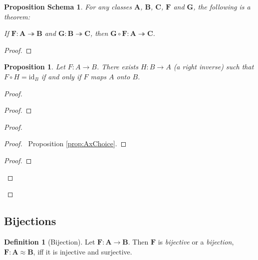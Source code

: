\documentclass{book}
\let\qed\relax
\newtheorem{prop}[ax]{Proposition}
\newtheorem{props}[ax]{Proposition Schema}
\theoremstyle{definition}
\newtheorem{df}[ax]{Definition}
\newcommand{\id}[1]{\ensuremath{\mathrm{id}_{#1}}}
\begin{document}
\begin{props}
\label{prop:compsurj}
For any classes $\mathbf{A}$, $\mathbf{B}$, $\mathbf{C}$, $\mathbf{F}$ and $\mathbf{G}$, the following is a theorem:

If $\mathbf{F} : \mathbf{A} \twoheadrightarrow \mathbf{B}$ and $\mathbf{G} : \mathbf{B} \twoheadrightarrow \mathbf{C}$, then $\mathbf{G} \circ \mathbf{F} : \mathbf{A} \twoheadrightarrow \mathbf{C}$.
\end{props}

\begin{proof}
\pf
{}
\qed
\end{proof}
\begin{prop}
Let $F : A \rightarrow B$. There exists $H : B \rightarrow A$ (a \emph{right inverse}) such that $F \circ H = \id{B}$ if and only if $F$ maps $A$ onto $B$.
\end{prop}

\begin{proof}
\pf
{}
\begin{proof}
\end{proof}
\begin{proof}
	\begin{proof}
		\pf\ Proposition \ref{prop:AxChoice}.
	\end{proof}
	\step{d}{$F \circ H = \id{B}$}
	\begin{proof}
	\end{proof}
\end{proof}
\qed
\end{proof}

\subsection{Bijections}

\begin{df}[Bijection]
Let $\mathbf{F} : \mathbf{A} \rightarrow \mathbf{B}$. Then $\mathbf{F}$ is \emph{bijective} or a \emph{bijection}, $\mathbf{F} : \mathbf{A} \approx \mathbf{B}$, iff it is injective and surjective.
\end{df}
\end{document}
